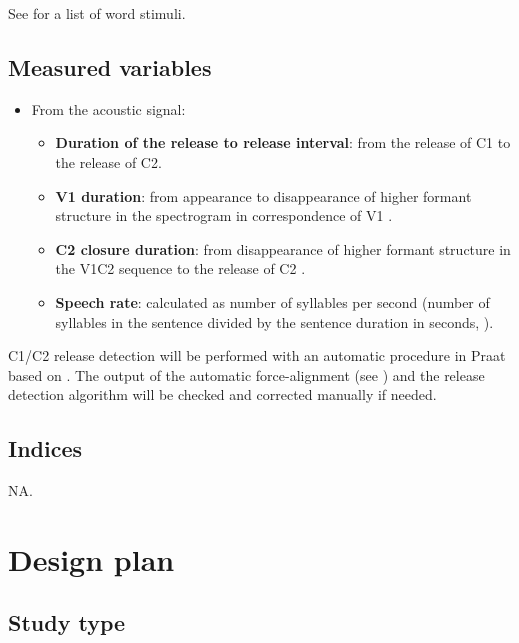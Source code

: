 \documentclass[11pt,]{article}
\providecommand{\tightlist}{%
  \setlength{\itemsep}{0pt}\setlength{\parskip}{0pt}}
\begin{document}
See  for a list of word stimuli.

\subsection{Measured variables}\label{measured-variables}

\begin{itemize}
\tightlist
\item
  From the acoustic signal:

  \begin{itemize}
  \tightlist
  \item
    \textbf{Duration of the release to release interval}: from the
    release of C1 to the release of C2.
  \item
    \textbf{V1 duration}: from appearance to disappearance of higher
    formant structure in the spectrogram in correspondence of V1
    \citep{machac2009}.
  \item
    \textbf{C2 closure duration}: from disappearance of higher formant
    structure in the V1C2 sequence to the release of C2
    \citep{machac2009}.
  \item
    \textbf{Speech rate}: calculated as number of syllables per second
    (number of syllables in the sentence divided by the sentence
    duration in seconds, \citealt{plug2018}).
  \end{itemize}
\end{itemize}

C1/C2 release detection will be performed with an automatic procedure in
Praat based on \citet{ananthapadmanabha2014}. The output of the
automatic force-alignment (see ) and the release
detection algorithm will be checked and corrected manually if needed.

\subsection{Indices}\label{indices}

NA.

\section{Design plan}\label{design-plan}

\subsection{Study type}\label{study-type}
\end{document}
